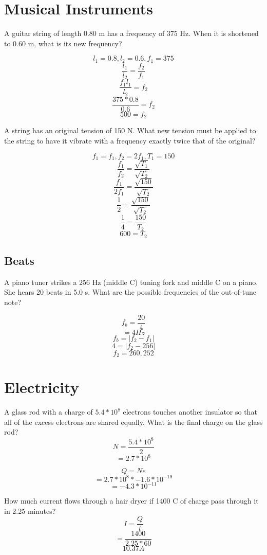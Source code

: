 \documentclass[10pt]{article}
\begin{document}
\section{Musical Instruments}

A guitar string of length 0.80 m has a frequency of 375 Hz. When it is shortened to 0.60 m, what is its new frequency?

$$l_1=0.8,l_2=0.6,f_1=375$$
$$\frac{l_1}{l_2}=\frac{f_2}{f_1}$$
$$\frac{f_1l_1}{l_2}=f_2$$
$$\frac{375*0.8}{0.6}=f_2$$
$$500=f_2$$

A string has an original tension of 150 N. What new tension must be applied to the string to have it vibrate with a frequency exactly twice that of the original?

$$f_1=f_1,f_2=2f_1,T_1=150$$
$$\frac{f_1}{f_2}=\frac{\sqrt{T_1}}{\sqrt{T_2}}$$
$$\frac{f_1}{2f_1}=\frac{\sqrt{150}}{\sqrt{T_2}}$$
$$\frac{1}{2}=\frac{\sqrt{150}}{\sqrt{T_2}}$$
$$\frac{1}{4}=\frac{150}{T_2}$$
$$600=T_2$$

\subsection{Beats}

A piano tuner strikes a 256 Hz (middle C) tuning fork and middle C on a piano. She hears 20 beats in 5.0 s. What are the possible frequencies of the out-of-tune note?

$$f_b=\frac{20}{4}$$
$$=4Hz$$
$$f_b=|f_2-f_1|$$
$$4=|f_2-256|$$
$$f_2=260,252$$

\section{Electricity}


A glass rod with a charge of $5.4*10^8$ electrons touches another insulator so that all of the excess electrons are shared equally. What is the final charge on the glass rod?
$$N=\frac{5.4*10^8}{2}$$
$$=2.7*10^8$$

$$Q=Ne$$
$$=2.7*10^8*-1.6*10^{-19}$$
$$=-4.3*10^{-11}$$

How much current flows through a hair dryer if 1400 C of charge pass through it in 2.25 minutes?
$$I=\frac{Q}{t}$$
$$=\frac{1400}{2.25*60}$$
$$10.37A$$
\end{document}
